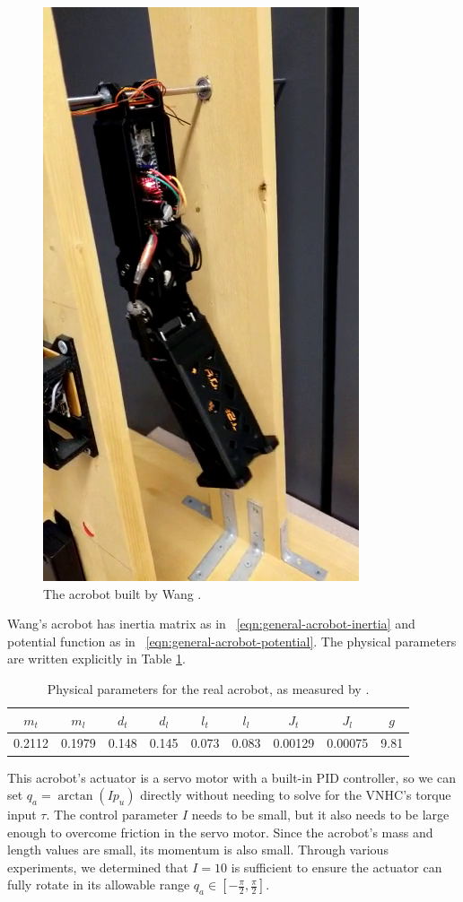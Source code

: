 \begin{figure}
    \centering
    \includegraphics[width=0.5\linewidth]{images/xingbo_acrobot.png}
    \caption{The acrobot built by Wang \cite{xingbo_thesis}.}
    \label{fig:xingbo-acrobot}
\end{figure}

Wang's acrobot  has inertia matrix as in ~\eqref{eqn:general-acrobot-inertia}
and potential function as in ~\eqref{eqn:general-acrobot-potential}.
The physical parameters are written explicitly in Table
\ref{tab:acrobot-parameters}.

\begin{table}
    \centering
    \caption{Physical parameters for the real acrobot, as measured by
    \citet{xingbo_thesis}.}
    \label{tab:acrobot-parameters}
    \begin{tabular}{ccccccccc}
        \toprule
        $m_t$ & $m_l$ & $d_t$ & $d_l$ & $l_t$ & $l_l$ & $J_t$ & $J_l$ & $g$ \\
        \midrule
        0.2112 & 0.1979 & %
        0.148 & 0.145 & %
        0.073 & 0.083 & %
        0.00129 & 0.00075 & %
        9.81 \\ %
        \bottomrule
    \end{tabular}
\end{table}

This acrobot's actuator is a servo motor with a built-in PID controller, so we
can set \(q_a = \arctan\left(I p_u\right)\) directly without needing to solve
for the VNHC's torque input \(\tau\).
The control parameter \(I\) needs to be small, but it also needs to be large
enough to overcome friction in the servo motor.
Since the acrobot's mass and length values are small, its momentum is
also small.
Through various experiments, we determined that \(I = 10\) is sufficient to
ensure the actuator can fully rotate in its allowable range
\(q_a \in \left[ -\frac{\pi}{2}, \frac{\pi}{2}\right]\).

